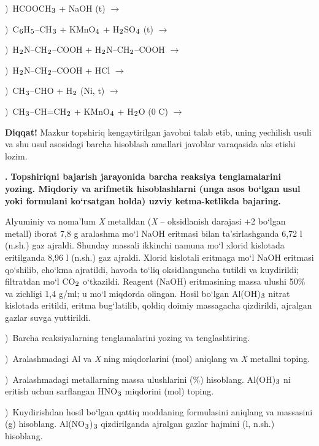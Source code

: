\documentclass[11pt,a4paper]{article}
\renewcommand{\textsubscript}[1]{\ensuremath{_{\text{\fontsize{8}{8}\selectfont #1}}}}
\newcommand{\qn}[1]{\textbf{\fontsize{11.5}{13}\selectfont #1}}
\newcommand{\qsep}{\par\vspace{13pt}}
\newcommand{\diqqat}[1]{\par\smallskip\noindent\textbf{Diqqat!} #1\par\medskip}
\begin{document}
)\ HCOOCH\textsubscript{3} + NaOH (t) $\to$\par
{})\ C\textsubscript{6}H\textsubscript{5}--CH\textsubscript{3} + KMnO\textsubscript{4} + H\textsubscript{2}SO\textsubscript{4} (t) $\to$\par
{})\ H\textsubscript{2}N--CH\textsubscript{2}--COOH + H\textsubscript{2}N--CH\textsubscript{2}--COOH $\to$\par
{})\ H\textsubscript{2}N--CH\textsubscript{2}--COOH + HCl $\to$\par
{})\ CH\textsubscript{3}--CHO + H\textsubscript{2} (Ni, t) $\to$\par
{})\ CH\textsubscript{3}--CH=CH\textsubscript{2} + KMnO\textsubscript{4} + H\textsubscript{2}O (0 \textdegree{}C) $\to$\par
\diqqat{Mazkur topshiriq kengaytirilgan javobni talab etib, uning yechilish usuli va shu usul asosidagi barcha hisoblash amallari javoblar varaqasida aks etishi lozim.}\qsep
\noindent\qn{43.} \textbf{Topshiriqni bajarish jarayonida barcha reaksiya tenglamalarini yozing. Miqdoriy va arifmetik hisoblashlarni (unga asos bo`lgan usul yoki formulani ko`rsatgan holda) uzviy ketma-ketlikda bajaring.}\par\smallskip
Alyuminiy va noma'lum \textit{X} metalldan (\textit{X} -- oksidlanish darajasi +2 bo`lgan metall) iborat 7,8 g aralashma mo`l NaOH eritmasi bilan ta'sirlashganda 6,72 l (n.sh.) gaz ajraldi. Shunday massali ikkinchi namuna mo`l xlorid kislotada eritilganda 8,96 l (n.sh.) gaz ajraldi. Xlorid kislotali eritmaga mo`l NaOH eritmasi qo`shilib, cho`kma ajratildi, havoda to`liq oksidlanguncha tutildi va kuydirildi; filtratdan mo`l CO\textsubscript{2} o`tkazildi. Reagent (NaOH) eritmasining massa ulushi 50\% va zichligi 1,4 g/ml; u mo`l miqdorda olingan. Hosil bo`lgan Al(OH)\textsubscript{3} nitrat kislotada eritildi, eritma bug`latilib, qoldiq doimiy massagacha qizdirildi, ajralgan gazlar suvga yuttirildi.\par
{})\ Barcha reaksiyalarning tenglamalarini yozing va tenglashtiring.\par
{})\ Aralashmadagi Al va \textit{X} ning miqdorlarini (mol) aniqlang va \textit{X} metallni toping.\par
{})\ Aralashmadagi metallarning massa ulushlarini (\%) hisoblang. Al(OH)\textsubscript{3} ni eritish uchun sarflangan HNO\textsubscript{3} miqdorini (mol) toping.\par
{})\ Kuydirishdan hosil bo`lgan qattiq moddaning formulasini aniqlang va massasini (g) hisoblang. Al(NO\textsubscript{3})\textsubscript{3} qizdirilganda ajralgan gazlar hajmini (l, n.sh.) hisoblang.\par
\end{document}
